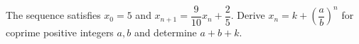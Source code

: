 The sequence satisfies $x_0=5$ and $x_{n+1}=\dfrac{9}{10}x_n+\dfrac{2}{5}$. Derive $x_n=k+(\dfrac{a}{b})^n$ for coprime positive integers $a,b$ and determine $a+b+k$.
